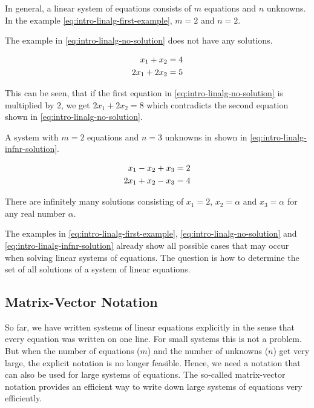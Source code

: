 \documentclass[
]{book}
\begin{document}
In general, a linear system of equations consists of \(m\) equations and \(n\) unknowns. In the example \eqref{eq:intro-linalg-first-example}, \(m=2\) and \(n=2\).

The example in \eqref{eq:intro-linalg-no-solution} does not have any solutions.

\begin{align}
 x_1 +  x_2 &= 4 \notag \\
2x_1 + 2x_2 &= 5
\label{eq:intro-linalg-no-solution}
\end{align}

This can be seen, that if the first equation in \eqref{eq:intro-linalg-no-solution} is multiplied by \(2\), we get \(2x_1 + 2x_2 = 8\) which contradicts the second equation shown in \eqref{eq:intro-linalg-no-solution}.

A system with \(m=2\) equations and \(n=3\) unknowns in shown in \eqref{eq:intro-linalg-infnr-solution}.

\begin{align}
 x_1 -  x_2 +  x_3 &= 2 \notag \\
2x_1 +  x_2 -  x_3 &= 4  
\label{eq:intro-linalg-infnr-solution}
\end{align}

There are infinitely many solutions consisting of \(x_1 = 2\), \(x_2 = \alpha\) and \(x_3 = \alpha\) for any real number \(\alpha\).

The examples in \eqref{eq:intro-linalg-first-example}, \eqref{eq:intro-linalg-no-solution} and \eqref{eq:intro-linalg-infnr-solution} already show all possible cases that may occur when solving linear systems of equations. The question is how to determine the set of all solutions of a system of linear equations.

\hypertarget{intro-linalg-matrix-vector-notation}{%
\subsection{Matrix-Vector Notation}\label{intro-linalg-matrix-vector-notation}}

So far, we have written systems of linear equations explicitly in the sense that every equation was written on one line. For small systems this is not a problem. But when the number of equations (\(m\)) and the number of unknowns (\(n\)) get very large, the explicit notation is no longer feasible. Hence, we need a notation that can also be used for large systems of equations. The so-called matrix-vector notation provides an efficient way to write down large systems of equations very efficiently.
\end{document}
